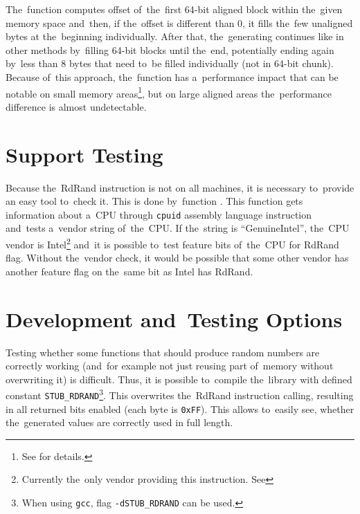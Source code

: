\par{
The~function computes offset of~the~first 64-bit aligned block within the~given memory space and~then, if the~offset is different than 0, it fills the~few unaligned bytes at the~beginning individually. After that, the~generating continues like in other methods by~filling 64-bit blocks until the~end, potentially ending again by~less than 8 bytes that need to~be filled individually (not in 64-bit chunk). Because of~this approach, the~function has a~performance impact that can be notable on small memory areas\footnote{See  for details.}, but on large aligned areas the~performance difference is almost undetectable. 
}

\section{Support Testing}
\par{
Because the~RdRand instruction is not on all machines, it is necessary to~provide an easy tool to~check it. This is done by~function . This function gets information about a~CPU through {\tt cpuid} assembly language instruction and~tests a~vendor string of~the~CPU. If the~string is ``GenuineIntel'', the~CPU vendor is Intel\footnote{Currently the~only vendor providing this instruction. See } and~it is possible to~test feature bits of~the~CPU for RdRand flag. Without the~vendor check, it would be possible that some other vendor has another feature flag on the~same bit as Intel has RdRand.
}

\section{Development and~Testing Options}
\par{
Testing whether some functions that should produce random numbers are correctly working (and~for example not just reusing part of~memory without overwriting it) is difficult. Thus, it is possible to~compile the~library with defined constant {\tt STUB\_RDRAND}\footnote{When using {\tt gcc}, flag {\tt -dSTUB\_RDRAND} can be used.}. This overwrites the~RdRand instruction calling, resulting in all returned bits enabled (each byte is {\tt 0xFF}). This allows to~easily see, whether the~generated values are correctly used in full length.
}

